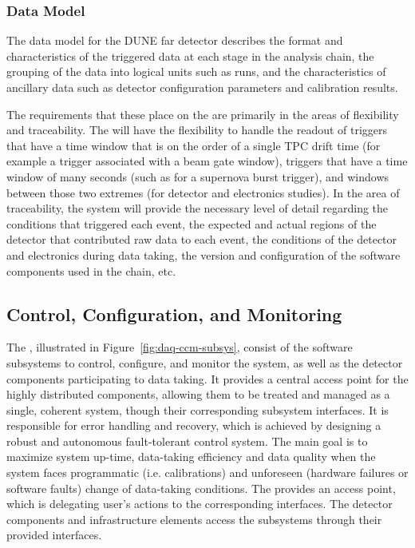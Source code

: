 \subsubsection{Data Model}
\label{sec:daq:design-data-model}

The data model for the DUNE far detector describes the format and characteristics of the triggered data at each stage in the analysis chain, the grouping of the data into logical units such as runs, and the characteristics of ancillary data such as detector configuration parameters and calibration results.

The requirements that these place on the  are primarily in the areas of flexibility and traceability.  The  will have the flexibility to handle the readout of triggers that have a time window that is on the order of a single TPC drift time (for example a trigger associated with a beam gate window), triggers that have a time window of many seconds (such as for a supernova burst trigger), and windows between those two extremes (for detector and electronics studies).  In the area of traceability, the  system will provide the necessary level of detail regarding the conditions that triggered each event, the expected and actual regions of the detector that contributed raw data to each event, the conditions of the detector and electronics during data taking, the version and configuration of the software components used in the  chain, etc.

\subsection{Control, Configuration, and Monitoring}
\label{sec:daq:design-run-control}

The , illustrated in Figure~\ref{fig:daq-ccm-subsys}, consist of the software
subsystems to control, configure, and monitor the  system, as well as the detector components
participating to data taking. It provides a central access point for the highly distributed 
components, allowing them to be treated and managed as a single, coherent system, though their
corresponding subsystem interfaces. It is responsible for error handling and recovery, which is
achieved by designing a robust and autonomous fault-tolerant control system. The main goal is to
maximize system up-time, data-taking efficiency and data quality when the system faces programmatic
(i.e. calibrations) and unforeseen (hardware failures or software faults) change of data-taking
conditions. The  provides an access point, which is delegating user's actions to the
corresponding interfaces. The detector components and infrastructure elements access the 
subsystems through their provided interfaces. 

